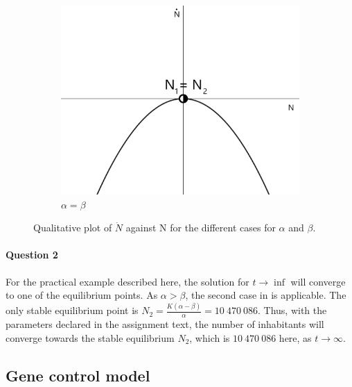 \documentclass[a4paper,11pt]{article}
\begin{document}
\begin{figure}[H]
{\begin{subfigure}{0.45\linewidth}
		\includegraphics[width=\textwidth]{aisb.png}
		\caption{$\alpha=\beta$}
	\end{subfigure}
	}
	\caption{Qualitative plot of $\dot{N}$ against N for the different cases for $\alpha$ and $\beta$.}
	\label{fig:trbif}
\end{figure}
\paragraph{Question 2}\: For the practical example described here, the solution for $t\rightarrow\inf$ will converge to one 
of the equilibrium points. As $\alpha>\beta$, the second case in  is applicable. The only stable equilibrium point
is $N_2=\frac{K(\alpha-\beta)}{\alpha}=10\:470\:086$. Thus, with the parameters declared in the assignment text,
the number of inhabitants will converge towards the stable equilibrium $N_2$, which is $10\:470\:086$ here, as 
$t\rightarrow\infty$.\\

\subsection{Gene control model}
\end{document}

